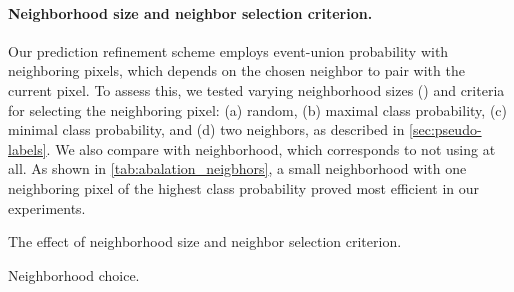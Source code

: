 \documentclass{article}
\begin{document}
\paragraph{Neighborhood size and neighbor selection criterion.} 
Our prediction refinement scheme employs event-union probability with neighboring pixels, which depends on the chosen neighbor to pair with the current pixel. To assess this, we tested varying neighborhood sizes () and criteria for selecting the neighboring pixel: (a) random, (b) maximal class probability, (c) minimal class probability, and (d) two neighbors, as described in \cref{sec:pseudo-labels}. We also compare with  neighborhood, which corresponds to not using \methodname{} at all. As shown in \cref{tab:abalation_neigbhors}, a small  neighborhood with one neighboring pixel of the highest class probability proved most efficient in our experiments.

\begin{table}
\caption{The effect of neighborhood size and neighbor selection criterion.}
\begin{subtable}[t]{0.53\textwidth}\centering
\caption{Neighborhood choice.}
\setlength{\tabcolsep}{10pt}
\label{tab:abalation_neigbhors}
\end{subtable}
\hfill
\begin{subtable}[t]{0.43\textwidth}\centering
\caption{
 in \cref{eq:alpha}, which controls the initial proportion of confidence pixels 
}
\setlength{\tabcolsep}{10pt}
\label{tab:abalation_alpha}
\end{subtable}
\vspace{-0.5cm}
\end{table}
\end{document}
